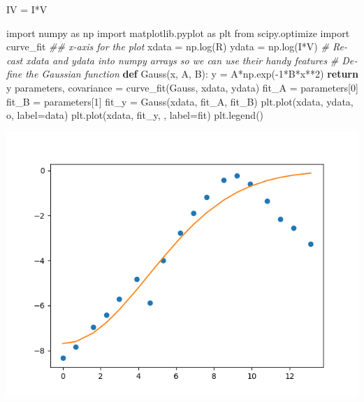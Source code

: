 \documentclass{article}
\newenvironment{Shaded}{}{}
\newcommand{\CommentTok}[1]{\textcolor[rgb]{0.38,0.63,0.69}{\textit{#1}}}
\newcommand{\ControlFlowTok}[1]{\textcolor[rgb]{0.00,0.44,0.13}{\textbf{#1}}}
\newcommand{\DecValTok}[1]{\textcolor[rgb]{0.25,0.63,0.44}{#1}}
\newcommand{\ImportTok}[1]{#1}
\newcommand{\KeywordTok}[1]{\textcolor[rgb]{0.00,0.44,0.13}{\textbf{#1}}}
\newcommand{\NormalTok}[1]{#1}
\newcommand{\OperatorTok}[1]{\textcolor[rgb]{0.40,0.40,0.40}{#1}}
\newcommand{\StringTok}[1]{\textcolor[rgb]{0.25,0.44,0.63}{#1}}
\begin{document}
\begin{latin}
\begin{Shaded}
\begin{Highlighting}[]
\NormalTok{IV }\OperatorTok{=}\NormalTok{ I}\OperatorTok{*}\NormalTok{V}
\end{Highlighting}
\end{Shaded}
\begin{Shaded}
\begin{Highlighting}[]
\ImportTok{import}\NormalTok{ numpy }\ImportTok{as}\NormalTok{ np}
\ImportTok{import}\NormalTok{ matplotlib.pyplot }\ImportTok{as}\NormalTok{ plt}
\ImportTok{from}\NormalTok{ scipy.optimize }\ImportTok{import}\NormalTok{ curve\_fit}
\CommentTok{\#\# x{-}axis for the plot}
\NormalTok{xdata }\OperatorTok{=}\NormalTok{ np.log(R)}
\NormalTok{ydata }\OperatorTok{=}\NormalTok{ np.log(I}\OperatorTok{*}\NormalTok{V)}
\CommentTok{\# Recast xdata and ydata into numpy arrays so we can use their handy features}
\CommentTok{\# Define the Gaussian function}
\KeywordTok{def}\NormalTok{ Gauss(x, A, B):}
\NormalTok{    y }\OperatorTok{=}\NormalTok{ A}\OperatorTok{*}\NormalTok{np.exp(}\OperatorTok{{-}}\DecValTok{1}\OperatorTok{*}\NormalTok{B}\OperatorTok{*}\NormalTok{x}\OperatorTok{**}\DecValTok{2}\NormalTok{)}
\ControlFlowTok{return}\NormalTok{ y}
\NormalTok{parameters, covariance }\OperatorTok{=}\NormalTok{ curve\_fit(Gauss, xdata, ydata)}
\NormalTok{fit\_A }\OperatorTok{=}\NormalTok{ parameters[}\DecValTok{0}\NormalTok{]}
\NormalTok{fit\_B }\OperatorTok{=}\NormalTok{ parameters[}\DecValTok{1}\NormalTok{]}
\NormalTok{fit\_y }\OperatorTok{=}\NormalTok{ Gauss(xdata, fit\_A, fit\_B)}
\NormalTok{plt.plot(xdata, ydata, }\StringTok{\textquotesingle{}o\textquotesingle{}}\NormalTok{, label}\OperatorTok{=}\StringTok{\textquotesingle{}data\textquotesingle{}}\NormalTok{)}
\NormalTok{plt.plot(xdata, fit\_y, }\StringTok{\textquotesingle{}{-}\textquotesingle{}}\NormalTok{, label}\OperatorTok{=}\StringTok{\textquotesingle{}fit\textquotesingle{}}\NormalTok{)}
\NormalTok{plt.legend()}
\end{Highlighting}
\end{Shaded}
\begin{center}
\includegraphics[scale=0.75]{Gaussian fit.png}
\end{center}
\end{latin}
\end{document}

